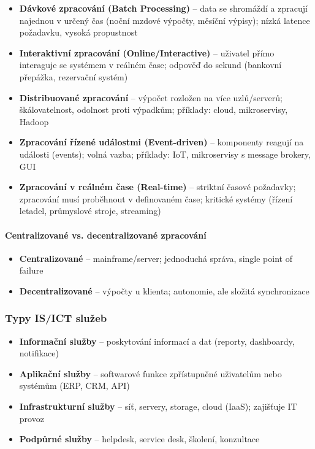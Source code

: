 \begin{itemize}
  \item \textbf{Dávkové zpracování (Batch Processing)} -- data se shromáždí a zpracují najednou
    v určený čas (noční mzdové výpočty, měsíční výpisy); nízká latence požadavku, vysoká propustnost
  \item \textbf{Interaktivní zpracování (Online/Interactive)} -- uživatel přímo interaguje se systémem
    v reálném čase; odpověď do sekund (bankovní přepážka, rezervační systém)
  \item \textbf{Distribuované zpracování} -- výpočet rozložen na více uzlů/serverů;
    škálovatelnost, odolnost proti výpadkům; příklady: cloud, mikroservisy, Hadoop
  \item \textbf{Zpracování řízené událostmi (Event-driven)} -- komponenty reagují na události (events);
    volná vazba; příklady: IoT, mikroservisy s message brokery, GUI
  \item \textbf{Zpracování v reálném čase (Real-time)} -- striktní časové požadavky; zpracování musí
    proběhnout v definovaném čase; kritické systémy (řízení letadel, průmyslové stroje, streaming)
\end{itemize}

\paragraph{Centralizované vs. decentralizované zpracování}
\begin{itemize}
  \item \textbf{Centralizované} -- mainframe/server; jednoduchá správa, single point of failure
  \item \textbf{Decentralizované} -- výpočty u klienta; autonomie, ale složitá synchronizace
\end{itemize}

\subsubsection{Typy IS/ICT služeb}

\begin{itemize}
  \item \textbf{Informační služby} -- poskytování informací a dat (reporty, dashboardy, notifikace)
  \item \textbf{Aplikační služby} -- softwarové funkce zpřístupněné uživatelům nebo systémům (ERP, CRM, API)
  \item \textbf{Infrastrukturní služby} -- síť, servery, storage, cloud (IaaS); zajišťuje IT provoz
  \item \textbf{Podpůrné služby} -- helpdesk, service desk, školení, konzultace
\end{itemize}


